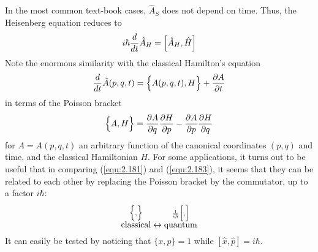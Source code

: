  In the most common text-book cases, $\hat{A}_S$ does not
 depend on time. Thus, the Heisenberg equation reduces to
 \begin{equation}
   i\hbar \frac{d}{dt} \hat{A}_H = \Bigl[\hat{A}_H, \hat{H}\Bigr]
   \label{equ:2.182}
 \end{equation}
Note the enormous similarity with the classical Hamilton's
equation
\begin{equation}
  \frac{d}{dt} \hat{A}(p,q,t) = \Bigl\{A(p,q,t), H\Bigr\} +
  \frac{\partial A}{\partial t}
  \label{equ:2.183}
\end{equation}
in terms of the Poisson bracket
\begin{equation}
  \Bigl\{A,H\Bigr\} = \frac{\partial A}{\partial q}
  \frac{\partial H}{\partial p} - \frac{\partial A}{\partial
  p} \frac{\partial H}{\partial q}
  \label{equ:2.184}
\end{equation}
for $A = A(p,q,t)$ an arbitrary function of the canonical
coordinates $(p,q)$ and time, and the classical Hamiltonian
$H$. For some applications, it turns out to be useful that
in comparing (\ref{equ:2.181}) and (\ref{equ:2.183}), it
seems that they can be related to each other by replacing
the Poisson bracket by the commutator, up to a factor
$i\hbar$:
\begin{equation}
  \overset{\Bigl\{,\Bigr\}}{\text{classical}}
  \leftrightarrow
  \overset{\frac{1}{i\hbar} \Bigl[,\Bigr]}{\text{quantum}}
  \label{equ:2.185}
\end{equation}
It can easily be tested by noticing that $\{x,p\} = 1$ while
$[\hat{x}, \hat{p}] = i\hbar$.
